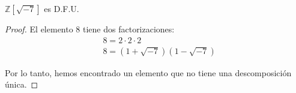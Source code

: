 \begin{ce}
    $\mathbb{Z}[\sqrt{-7}]$ es D.F.U.
\end{ce}

\begin{proof}
    El elemento $8$ tiene dos factorizaciones:
    \begin{equation}
        \begin{split}
            & 8 = 2\cdot 2\cdot 2\\
            & 8 = (1 + \sqrt{-7})(1-\sqrt{-7})
        \end{split}
    \end{equation}

    Por lo tanto, hemos encontrado un elemento que no tiene una descomposición única.
\end{proof}
